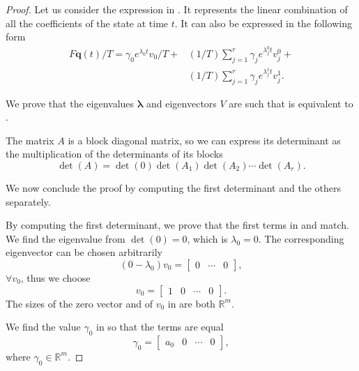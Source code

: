 \begin{proof}
Let us consider the expression in . It represents the linear combination of all the coefficients of the state at time $t$. It can also be expressed in the following form
\begin{equation}\label{eq:proof-output}\begin{split}
  F\mathbf{q}(t)/T=\gamma_0 e^{\lambda_0t}v_0/T+&(1/T)\sum_{j=1}^r{\gamma_j e^{\lambda_j^0t}v_j^0}+\\&(1/T)\sum_{j=1}^r{\gamma_j e^{\lambda_j^1t}v_j^1}.
\end{split}\end{equation}

We prove that the eigenvalues $\mathbf{\lambda}$ and eigenvectors $V$ are such that  is equivalent to .

The matrix $A$ is a block diagonal matrix, so we can express its determinant as the multiplication of the determinants of its blocks
\begin{equation}
  \det{(A)}=\det{(0)}\det{(A_1)}\det{(A_2)}\cdots\det{(A_r)}.
\end{equation}

We now conclude the proof by computing the first determinant and the others separately.

By computing the first determinant, we prove that the first terms in  and  match. We find the eigenvalue from $\det(0)=0$, which is $\lambda_0=0$. The corresponding eigenvector can be chosen arbitrarily
\begin{equation}\label{eq:proof-first-det}
  (0-\lambda_0)v_0=\begin{bmatrix} 0 & \cdots & 0 \end{bmatrix},
\end{equation}
$\forall v_0$, thus we choose
\begin{equation}\label{eq:proof-v0}
  v_0=\begin{bmatrix}1 & 0 & \cdots & 0\end{bmatrix}.
\end{equation}
The sizes of the zero vector and of $v_0$ in  are both $\mathbb{R}^m$.

We find the value $\gamma_0$ in  so that the terms are equal 
\begin{equation}
  \gamma_0=\begin{bmatrix}a_0 & 0 & \cdots & 0\end{bmatrix},
\end{equation} 
where $\gamma_0\in\mathbb{R}^m$.


\end{proof}
